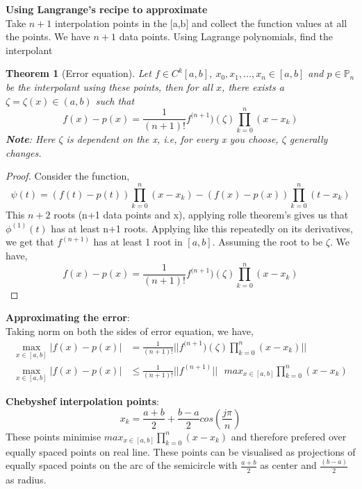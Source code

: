 \documentclass{article}
\newtheorem*{theorem}{Theorem}
\begin{document}
	\noindent\textbf{Using Langrange's recipe to approximate}\\
	Take $n+1$ interpolation points in the [a,b] and collect the function values at all the points. We have $n+1$ data points. Using Lagrange polynomials, find the interpolant\\
		

	\begin{theorem}[Error equation]
	\label{error}
		Let $f\in C^k[a,b]$, $x_0,x_1,\hdots,x_n \in [a,b]$ and $p\in \mathbb{P}_n$ be the interpolant using these points, then for all $x$, there exists a $\zeta = \zeta(x) \in (a,b)$ such that
		\[\boxed{f(x)-p(x) = \frac{1}{(n+1)!}f^{(n+1})(\zeta)\prod_{k=0}^n(x-x_k)}\]
		\textbf{Note}: Here $\zeta$ is dependent on the x, i.e, for every x you choose, $\zeta$ generally changes.\\
	\end{theorem}

	\begin{proof}
		Consider the function,
		\[\psi(t)=(f(t)- p(t))\prod_{k=0}^n(x-x_k) - (f(x)-p(x))\prod_{k=0}^n(t-x_k)\]
		This $n+2$ roots (n+1 data points and x), applying rolle theorem's gives us that $\phi^{(1)}(t)$ has at least n+1 roots. Applying like this repeatedly on its derivatives, we get that $f^{(n+1)}$ has at least 1 root in $[a,b]$. Assuming the root to be $\zeta$. We have,
		\[f(x)-p(x) = \frac{1}{(n+1)!}f^{(n+1})(\zeta)\prod_{k=0}^n(x-x_k)\]
	\end{proof}


	\noindent\textbf{Approximating the error}:\\
	Taking norm on both the sides of error equation, we have,
	\begin{align}
		\max_{x\in [a,b]} |f(x)-p(x)| &= \frac{1}{(n+1)!}||f^{(n+1})(\zeta)\prod_{k=0}^n(x-x_k)||\\
		\max_{x\in [a,b]} |f(x)-p(x)| &\leq \frac{1}{(n+1)!} ||f^{(n+1)}||\text{ }max_{x \in [a,b]}\prod_{k=0}^n(x-x_k)
	\end{align}

	\noindent\textbf{Chebyshef interpolation points}:
		\[x_k= \frac{a+b}{2}+\frac{b-a}{2}cos\left(\frac{j\pi}{n}\right)\]
	\noindent These points minimise $max_{x \in [a,b]}\prod_{k=0}^n(x-x_k)$ and therefore prefered over equally spaced points on real line. These points can be visualised as projections of equally spaced points on the arc of the semicircle with $\frac{a+b}{2}$ as center and $\frac{(b-a)}{2}$ as radius.
\end{document}
